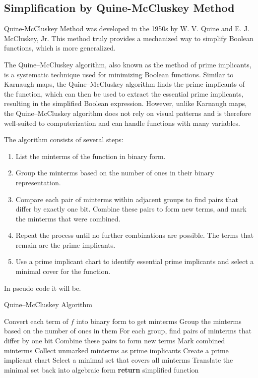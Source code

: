 	\subsection{Simplification by Quine-McCluskey Method}
	Quine-McCluskey Method was developed in the 1950s by W. V. Quine and E. J. McCluskey, Jr. This method truly provides a mechanized way to simplify Boolean functions, which is more generalized.
	
	The Quine–McCluskey algorithm, also known as the method of prime implicants, is a systematic technique used for minimizing Boolean functions. Similar to Karnaugh maps, the Quine–McCluskey algorithm finds the prime implicants of the function, which can then be used to extract the essential prime implicants, resulting in the simplified Boolean expression. However, unlike Karnaugh maps, the Quine–McCluskey algorithm does not rely on visual patterns and is therefore well-suited to computerization and can handle functions with many variables.
	
	The algorithm consists of several steps:
	\begin{enumerate}
		\item List the minterms of the function in binary form.
		\item Group the minterms based on the number of ones in their binary representation.
		\item Compare each pair of minterms within adjacent groups to find pairs that differ by exactly one bit. Combine these pairs to form new terms, and mark the minterms that were combined.
		\item Repeat the process until no further combinations are possible. The terms that remain are the prime implicants.
		\item Use a prime implicant chart to identify essential prime implicants and select a minimal cover for the function.
	\end{enumerate}
	
	In pseudo code it will be.
	\begin{algorithm}
		\caption{Quine–McCluskey Algorithm}\label{alg:quine_mccluskey}
		\begin{algorithmic}[1]
			\State Convert each term of $f$ into binary form to get minterms
			\State Group the minterms based on the number of ones in them
			\Repeat
			\State For each group, find pairs of minterms that differ by one bit
			\State Combine these pairs to form new terms
			\State Mark combined minterms
			\State Collect unmarked minterms as prime implicants
			\State Create a prime implicant chart
			\State Select a minimal set that covers all minterms
			\State Translate the minimal set back into algebraic form
			\State \textbf{return} simplified function
			\EndProcedure
		\end{algorithmic}
	\end{algorithm}
	

